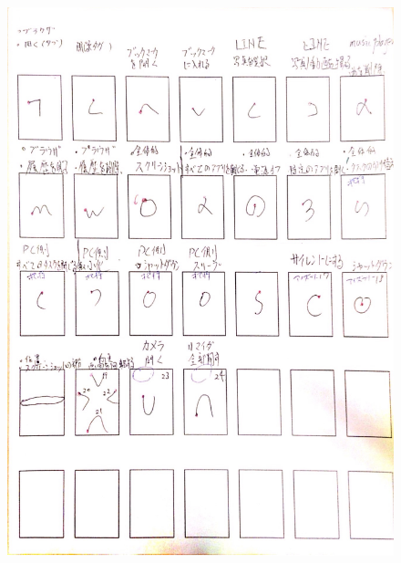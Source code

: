 \begin{figure} [p]
 \begin{center}
  \includegraphics [width=1.0\columnwidth]{img/P2.eps}
  \label{fig:elicitation_example}
 \end{center}
\end{figure}

